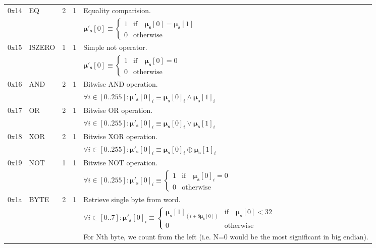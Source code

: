 \documentclass[9pt,oneside]{amsart}
\begin{document}
\begin{tabular*}{\columnwidth}[h]{rlrrl}
\midrule
0x14 & {\small EQ} & 2 & 1 & Equality comparision. \\
&&&& $\boldsymbol{\mu}'_\mathbf{s}[0] \equiv \begin{cases} 1 & \text{if} \quad \boldsymbol{\mu}_\mathbf{s}[0] = \boldsymbol{\mu}_\mathbf{s}[1] \\ 0 & \text{otherwise} \end{cases}$ \\
\midrule
0x15 & {\small ISZERO} & 1 & 1 & Simple not operator. \\
&&&& $\boldsymbol{\mu}'_\mathbf{s}[0] \equiv \begin{cases} 1 & \text{if} \quad \boldsymbol{\mu}_\mathbf{s}[0] = 0 \\ 0 & \text{otherwise} \end{cases}$ \\
\midrule
0x16 & {\small AND} & 2 & 1 & Bitwise AND operation. \\
&&&& $\forall i \in [0..255]: \boldsymbol{\mu}'_\mathbf{s}[0]_i \equiv \boldsymbol{\mu}_\mathbf{s}[0]_i \wedge \boldsymbol{\mu}_\mathbf{s}[1]_i$ \\
\midrule
0x17 & {\small OR} & 2 & 1 & Bitwise OR operation. \\
&&&& $\forall i \in [0..255]: \boldsymbol{\mu}'_\mathbf{s}[0]_i \equiv \boldsymbol{\mu}_\mathbf{s}[0]_i \vee \boldsymbol{\mu}_\mathbf{s}[1]_i$ \\
\midrule
0x18 & {\small XOR} & 2 & 1 & Bitwise XOR operation. \\
&&&& $\forall i \in [0..255]: \boldsymbol{\mu}'_\mathbf{s}[0]_i \equiv \boldsymbol{\mu}_\mathbf{s}[0]_i \oplus \boldsymbol{\mu}_\mathbf{s}[1]_i$ \\
\midrule
0x19 & {\small NOT} & 1 & 1 & Bitwise NOT operation. \\
&&&& $\forall i \in [0..255]: \boldsymbol{\mu}'_\mathbf{s}[0]_i \equiv \begin{cases} 1 & \text{if} \quad \boldsymbol{\mu}_\mathbf{s}[0]_i = 0 \\ 0 & \text{otherwise} \end{cases}$ \\
\midrule
0x1a & {\small BYTE} & 2 & 1 & Retrieve single byte from word. \\
&&&& $\forall i \in [0..7]: \boldsymbol{\mu}'_\mathbf{s}[0]_i \equiv \begin{cases} \boldsymbol{\mu}_\mathbf{s}[1]_{(i + 8\boldsymbol{\mu}_\mathbf{s}[0])} & \text{if} \quad \boldsymbol{\mu}_\mathbf{s}[0] < 32 \\ 0 & \text{otherwise} \end{cases} $\\
&&&& For Nth byte, we count from the left (i.e. N=0 would be the most significant in big endian). \\
\bottomrule
\end{tabular*}
\end{document}
